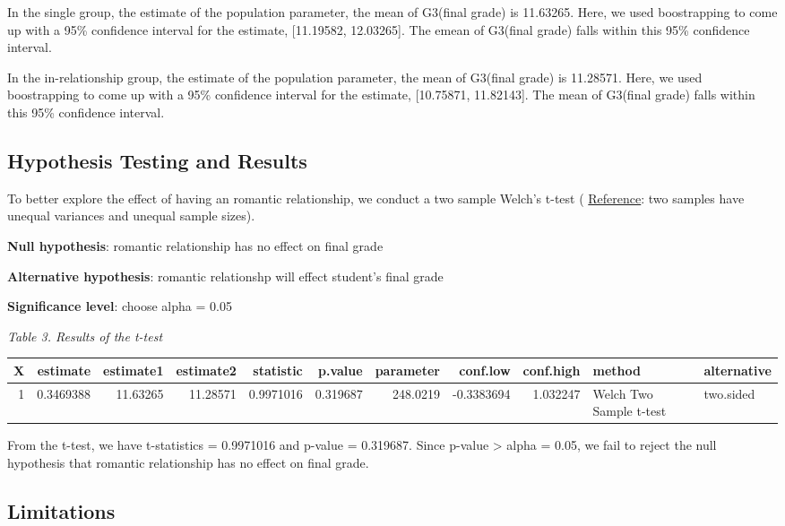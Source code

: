 \documentclass[]{article}
\begin{document}
In the single group, the estimate of the population parameter, the mean
of G3(final grade) is 11.63265. Here, we used boostrapping to come up
with a 95\% confidence interval for the estimate, {[}11.19582,
12.03265{]}. The emean of G3(final grade) falls within this 95\%
confidence interval.

In the in-relationship group, the estimate of the population parameter,
the mean of G3(final grade) is 11.28571. Here, we used boostrapping to
come up with a 95\% confidence interval for the estimate, {[}10.75871,
11.82143{]}. The mean of G3(final grade) falls within this 95\%
confidence interval.

\subsection{Hypothesis Testing and
Results}\label{hypothesis-testing-and-results}

To better explore the effect of having an romantic relationship, we
conduct a two sample Welch's t-test (
\href{https://en.wikipedia.org/wiki/Welch\%27s_t-test}{Reference}: two
samples have unequal variances and unequal sample sizes).

\textbf{Null hypothesis}: romantic relationship has no effect on final
grade

\textbf{Alternative hypothesis}: romantic relationshp will effect
student's final grade

\textbf{Significance level}: choose alpha = 0.05

\emph{Table 3. Results of the t-test}

\begin{longtable}[]{@{}rrrrrrrrrll@{}}
\toprule
X & estimate & estimate1 & estimate2 & statistic & p.value & parameter &
conf.low & conf.high & method & alternative\tabularnewline
\midrule
\endhead
1 & 0.3469388 & 11.63265 & 11.28571 & 0.9971016 & 0.319687 & 248.0219 &
-0.3383694 & 1.032247 & Welch Two Sample t-test &
two.sided\tabularnewline
\bottomrule
\end{longtable}

From the t-test, we have t-statistics = 0.9971016 and p-value =
0.319687. Since p-value \textgreater{} alpha = 0.05, we fail to reject
the null hypothesis that romantic relationship has no effect on final
grade.

\subsection{Limitations}\label{limitations}
\end{document}
